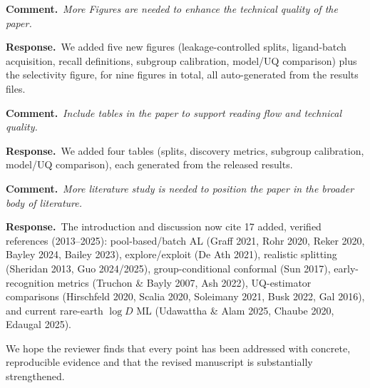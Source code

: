 \documentclass[11pt]{article}
\newcommand{\rev}[1]{\begingroup\itshape\color{gray}#1\endgroup}
\newcommand{\resp}{\par\noindent\textbf{Response.}\ }
\newcommand{\cmt}[1]{\par\vspace{4pt}\noindent\textbf{Comment.}\ \rev{#1}\par\vspace{2pt}}
\begin{document}
\cmt{More Figures are needed to enhance the technical quality of the paper.}
\resp We added five new figures (leakage-controlled splits, ligand-batch acquisition,
recall definitions, subgroup calibration, model/UQ comparison) plus the selectivity
figure, for nine figures in total, all auto-generated from the results files.

\cmt{Include tables in the paper to support reading flow and technical quality.}
\resp We added four tables (splits, discovery metrics, subgroup calibration, model/UQ
comparison), each generated from the released results.

\cmt{More literature study is needed to position the paper in the broader body of
literature.}
\resp The introduction and discussion now cite 17 added, verified references
(2013--2025): pool-based/batch AL (Graff 2021, Rohr 2020, Reker 2020, Bayley 2024,
Bailey 2023), explore/exploit (De Ath 2021), realistic splitting (Sheridan 2013, Guo
2024/2025), group-conditional conformal (Sun 2017), early-recognition metrics
(Truchon \& Bayly 2007, Ash 2022), UQ-estimator comparisons (Hirschfeld 2020, Scalia
2020, Soleimany 2021, Busk 2022, Gal 2016), and current rare-earth $\log D$ ML
(Udawattha \& Alam 2025, Chaube 2020, Edaugal 2025).

\vspace{6pt}
\noindent We hope the reviewer finds that every point has been addressed with concrete,
reproducible evidence and that the revised manuscript is substantially strengthened.
\end{document}
